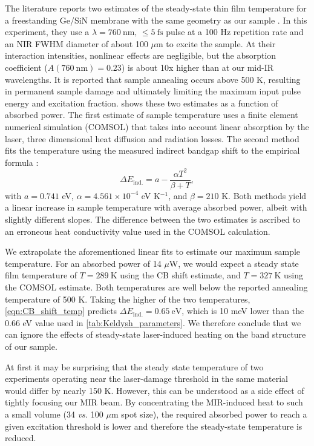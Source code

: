 The literature reports two estimates of the steady-state thin film temperature for a freestanding Ge/SiN membrane with the same geometry as our sample \cite{zurchDirectSimultaneousObservation2017}. In this experiment, they use a $\lambda=760 \ \textrm{nm,}$ $\le5 \ \textrm{fs}$ pulse at a 100 Hz repetition rate and an NIR FWHM diameter of about 100 $\mu$m to excite the sample. At their interaction intensities, nonlinear effects are negligible, but the absorption coefficient ($A (760 \ \textrm{nm}) = 0.23$) is about 10x higher than at our mid-IR wavelengths. It is reported that sample annealing occurs above 500 K, resulting in permanent sample damage and ultimately limiting the maximum input pulse energy and excitation fraction.  shows these two estimates as a function of absorbed power. The first estimate of sample temperature uses a finite element numerical simulation (COMSOL) that takes into account linear absorption by the laser, three dimensional heat diffusion and radiation losses. The second method fits the temperature using the measured indirect bandgap shift to the empirical formula \cite{vinaTemperatureDependenceDielectric1984}:
\begin{equation}
\Delta E_{\textrm{ind.}} = a - \frac{\alpha T^2}{\beta + T},
\label{eqn:CB_shift_temp}
\end{equation}
with $a = 0.741$ eV, $\alpha=4.561 \times 10^{-4}$ eV K$^{-1}$, and $\beta = 210$ K. Both methods yield a linear increase in sample temperature with average absorbed power, albeit with slightly different slopes. The difference between the two estimates is ascribed to an erroneous heat conductivity value used in the COMSOL calculation.

We extrapolate the aforementioned linear fits to estimate our maximum sample temperature. For an absorbed power of 14 $\mu$W, we would expect a steady state film temperature of $T = 289 \ \textrm{K}$ using the CB shift estimate, and $T = 327 \ \textrm{K}$ using the COMSOL estimate. Both temperatures are well below the reported annealing temperature of 500 K. Taking the higher of the two temperatures, \cref{eqn:CB_shift_temp} predicts $\Delta E_{\textrm{ind.}} = 0.65 \ \textrm{eV}$, which is 10 meV lower than the 0.66 eV value used in \cref{tab:Keldysh_parameters}. We therefore conclude that we can ignore the effects of steady-state laser-induced heating on the band structure of our sample.

At first it may be surprising that the steady state temperature of two experiments operating near the laser-damage threshold in the same material would differ by nearly 150 K. However, this can be understood as a side effect of tightly focusing our MIR beam. By concentrating the MIR-induced heat to such a small volume (34 \textit{vs.} 100 $\mu$m spot size), the required absorbed power to reach a given excitation threshold is lower and therefore the steady-state temperature is reduced. 

